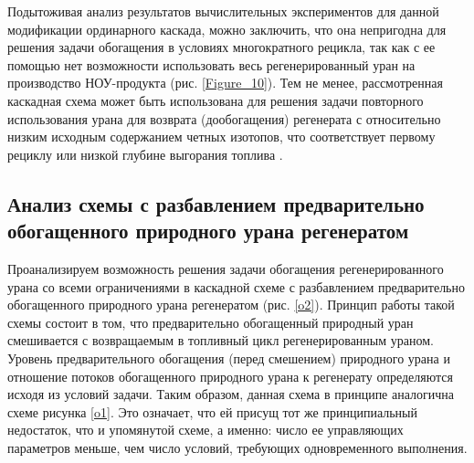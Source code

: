 Подытоживая анализ результатов вычислительных экспериментов для данной модификации ординарного каскада, можно заключить, что она непригодна для решения задачи обогащения в условиях многократного рецикла, так как с ее помощью нет возможности использовать весь регенерированный уран на производство НОУ-продукта (рис. \ref{Figure_10}). Тем не менее, рассмотренная каскадная схема может быть использована для решения задачи повторного использования урана для возврата (дообогащения) регенерата с относительно низким исходным содержанием четных изотопов, что соответствует первому рециклу или низкой глубине выгорания топлива \cite{smirnovKaskadnyeShemyZadachah2012}.

\subsection{Анализ схемы с разбавлением предварительно обогащенного природного урана регенератом}\label{sw_method}

Проанализируем возможность решения задачи обогащения регенерированного урана со всеми ограничениями в каскадной схеме с разбавлением предварительно обогащенного природного урана регенератом (рис. \ref{o2}). Принцип работы такой схемы состоит в том, что предварительно обогащенный природный уран смешивается с возвращаемым в топливный цикл регенерированным ураном. Уровень предварительного обогащения (перед смешением) природного урана и отношение потоков обогащенного природного урана к регенерату определяются исходя из условий задачи. Таким образом, данная схема в принципе аналогична схеме рисунка \ref{o1}. Это означает, что ей присущ тот же принципиальный недостаток, что и упомянутой схеме, а именно: число ее управляющих параметров меньше, чем число условий, требующих одновременного выполнения. 


